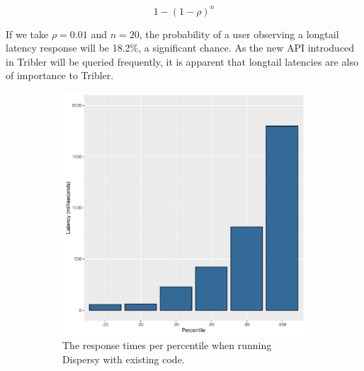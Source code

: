 \begin{equation}
	\label{eq:probability_high_latency}
	1 - (1 - \rho)^{n}
\end{equation}

If we take $\rho = 0.01$ and $n = 20$, the probability of a user observing a longtail latency response will be 18.2\%, a significant chance.
As the new API introduced in Tribler will be queried frequently, it is apparent that longtail latencies are also of importance to Tribler.

\begin{figure}[h]
	\begin{subfigure}[b]{.5\linewidth}
		\includegraphics[width=\textwidth]{experimentation/images/response_time_percentiles_sync}
		\caption{The response times per percentile when running Dispersy with existing code.}
		\label{fig:response_times_percentiles_sync}
	\end{subfigure}
	\begin{subfigure}[b]{.5\linewidth}

\end{subfigure}
\end{figure}
